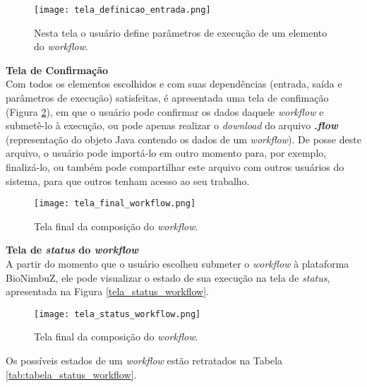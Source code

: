 \begin{figure}[H]
	\centering
	\texttt{[image: tela\_definicao\_entrada.png]}
	\caption{Nesta tela o usuário define parâmetros de execução de um elemento do \textit{workflow}.}
	\label{fig:tela_definicao_entrada}
\end{figure}

\noindent
\textbf{Tela de Confirmação} \\

\noindent
Com todos os elementos escolhidos e com suas dependências (entrada, saída e parâmetros de execução) satisfeitas, é apresentada uma tela de confimação (Figura \ref{fig:tela_final_workflow}), em que o usuário pode confirmar os dados daquele \textit{workflow} e submetê-lo à execução, ou pode apenas realizar o \textit{download} do arquivo \textbf{\textit{.flow}} (representação do objeto Java contendo os dados de um \textit{workflow}). De posse deste arquivo, o usuário pode importá-lo em outro momento para, por exemplo, finalizá-lo, ou também pode compartilhar este arquivo com outros usuários do sistema, para que outros tenham acesso ao seu trabalho.

\begin{figure}[H]
	\centering
	\texttt{[image: tela\_final\_workflow.png]}
	\caption{Tela final da composição do \textit{workflow}.}
	\label{fig:tela_final_workflow}
\end{figure}

\noindent
\textbf{Tela de \textit{status} do \textit{workflow}} \\

\noindent
A partir do momento que o usuário escolheu submeter o \textit{workflow} à plataforma BioNimbuZ, ele pode visualizar o estado de sua execução na tela de \textit{status}, apresentada na Figura \ref{tela_status_workflow}. 

\begin{figure}[H]
	\centering
	\texttt{[image: tela\_status\_workflow.png]}
	\caption{Tela final da composição do \textit{workflow}.}
	\label{fig:tela_status_workflow}
\end{figure}

Os possíveis estados de um \textit{workflow} estão retratados na Tabela \ref{tab:tabela_status_workflow}.



